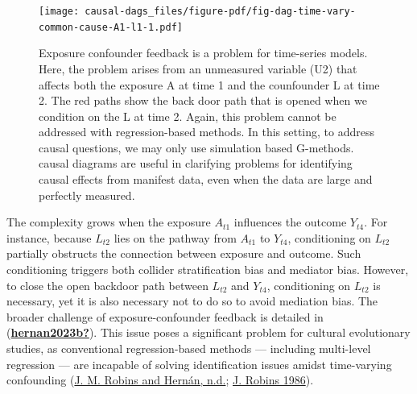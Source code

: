 \documentclass[
  singlecolumn]{report}
\begin{document}
\begin{figure}

{\centering \texttt{[image: causal-dags\_files/figure-pdf/fig-dag-time-vary-common-cause-A1-l1-1.pdf]}

}

\caption{\label{fig-dag-time-vary-common-cause-A1-l1}Exposure confounder
feedback is a problem for time-series models. Here, the problem arises
from an unmeasured variable (U2) that affects both the exposure A at
time 1 and the counfounder L at time 2. The red paths show the back door
path that is opened when we condition on the L at time 2. Again, this
problem cannot be addressed with regression-based methods. In this
setting, to address causal questions, we may only use simulation based
G-methods. causal diagrams are useful in clarifying problems for
identifying causal effects from manifest data, even when the data are
large and perfectly measured.}

\end{figure}

The complexity grows when the exposure \(A_{t1}\) influences the outcome
\(Y_{t4}\). For instance, because \(L_{t2}\) lies on the pathway from
\(A_{t1}\) to \(Y_{t4}\), conditioning on \(L_{t2}\) partially obstructs
the connection between exposure and outcome. Such conditioning triggers
both collider stratification bias and mediator bias. However, to close
the open backdoor path between \(L_{t2}\) and \(Y_{t4}\), conditioning
on \(L_{t2}\) is necessary, yet it is also necessary not to do so to
avoid mediation bias. The broader challenge of exposure-confounder
feedback is detailed in
(\protect\hyperlink{ref-hernan2023b}{\textbf{hernan2023b?}}). This issue
poses a significant problem for cultural evolutionary studies, as
conventional regression-based methods --- including multi-level
regression --- are incapable of solving identification issues amidst
time-varying confounding (\protect\hyperlink{ref-robins}{J. M. Robins
and Hernán, n.d.}; \protect\hyperlink{ref-robins1986}{J. Robins 1986}).
\end{document}
